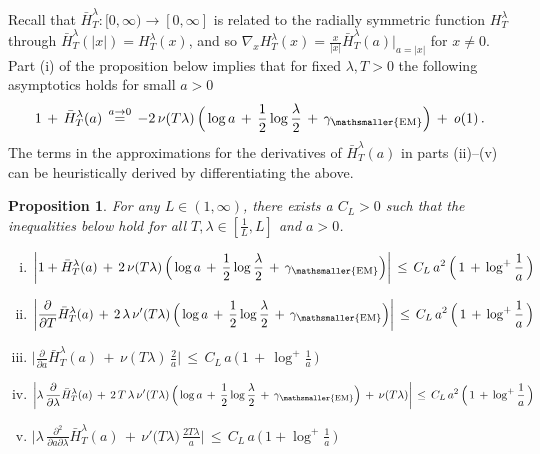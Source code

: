 \documentclass[10pt]{article}
\def\stackrel#1#2{\mathrel{\mathop{#2}\limits^{#1}}}
\numberwithin{equation}{section}
\newtheorem{proposition}[theorem]{Proposition}
\theoremstyle{definition}
\begin{document}
Recall that $\bar{H}_{T}^{\lambda}: [0,\infty)\rightarrow [0,\infty]$ is related to the radially symmetric function $H_{T}^{\lambda}$ through  $\bar{H}_{T}^{\lambda}(|x|)= H_{T}^{\lambda}(x)$, and so  $\nabla_x H_{T}^{\lambda}(x)=\frac{x}{|x|}\bar{H}_{T}^{\lambda}(a)\big|_{a=|x|}  $ for $x\neq 0$.  Part (i) of the proposition below implies that for fixed $\lambda, T>0$ the following asymptotics  holds   for small  $a> 0$ 
$$1\,+\,\bar{H}_{T}^{\lambda}(a)\, \stackrel{a\rightarrow 0}{=}\,-2\,\nu( T\lambda)\,\Big( \log a\,+\,  \frac{1}{2}\log \frac{\lambda }{2 }   \,+\,\gamma_{\mathsmaller{\textup{EM}}}\Big)\,+\,\mathit{o}(1)\,. $$
The terms in the approximations for the derivatives of $\bar{H}_{T}^{\lambda}(a)$ in parts (ii)--(v) can be heuristically derived  by differentiating the above.
\begin{proposition}\label{PropK}  For any $L\in (1,\infty) $, there exists a $C_{L}>0$ such that the inequalities below hold for all $T,\lambda \in [\frac{1}{L},  L] $  and $a>0$.
\begin{enumerate}[(i)]
\item  $ \displaystyle \bigg|1+\bar{H}_{T}^{\lambda}(a)\,+\, 2\,\nu( T\lambda)\,\Big(\log a\,+\,\frac{1}{2}\log \frac{\lambda }{2 }   \,+\,\gamma_{\mathsmaller{\textup{EM}}}\Big)\bigg| \,\leq \, C_{L}\, a^2\, \Big(\, 1\,+\,\log^+ \frac{1}{a}  \,\Big) $

\item $ \displaystyle \bigg|\frac{\partial}{\partial T}\bar{H}_{T}^{\lambda}(a)\,+\, 2\,\lambda \,\nu'(  T\lambda) \,\Big(\log a \,+\,\frac{1}{2}\log \frac{\lambda }{2 }  \, +\,\gamma_{\mathsmaller{\textup{EM}}}\Big)\bigg|\,\leq \,  C_{L}\,a^2 \,  \Big(\, 1\,+\,\log^+ \frac{1}{a}  \,\Big) $

\item $ \displaystyle \bigg|\frac{\partial}{\partial a}\bar{H}_{T}^{\lambda}(a)\,+\,\nu(T\lambda )\, \frac{2}{a}\bigg|\,\leq \,  C_{L}\,a \,\Big(\, 1\,+\,\log^+ \frac{1}{a}  \,\Big) $

\item  $ \displaystyle \bigg|\lambda \,\frac{\partial}{\partial \lambda}\bar{H}_{T}^{\lambda}(a)\,+\,2\, T\,\lambda \,\nu'( T\lambda)\,\Big(\log a\,+\,\frac{1}{2}\log \frac{\lambda }{2 }   \,+\,\gamma_{\mathsmaller{\textup{EM}}}\Big)\,+\,\nu(T\lambda )   \bigg|\,\leq \,  C_{L}\,a^2 \, \Big(\, 1\,+\,\log^+ \frac{1}{a}\,  \Big) $



\item $ \displaystyle \bigg|\lambda \,\frac{\partial^2}{\partial a\partial \lambda }\bar{H}_{T}^{\lambda}(a)\,+\, \nu'\big( T\lambda )\,\frac{2T\lambda}{a}\bigg|\,\leq \,  C_{L}\,a  \,\Big(\, 1+\log^+ \frac{1}{a}  \,\Big)   $

\end{enumerate}


\end{proposition}
\end{document}
